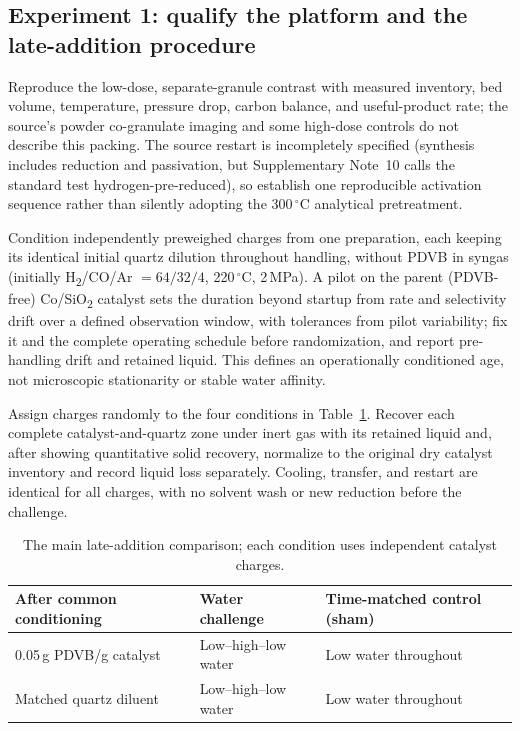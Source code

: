 \subsection{Experiment 1: qualify the platform and the late-addition procedure}

Reproduce the low-dose, separate-granule contrast with measured inventory, bed volume, temperature, pressure drop, carbon balance, and useful-product rate; the source's powder co-granulate imaging and some high-dose controls do not describe this packing. The source restart is incompletely specified (synthesis includes reduction and passivation, but Supplementary Note~10 calls the standard test hydrogen-pre-reduced), so establish one reproducible activation sequence rather than silently adopting the 300\,$^\circ$C analytical pretreatment.\cite{fang2026}

Condition independently preweighed charges from one preparation, each keeping its identical initial quartz dilution throughout handling, without PDVB in syngas (initially H\textsubscript{2}/CO/Ar $=64/32/4$, 220\,$^\circ$C, 2\,MPa). A pilot on the parent (PDVB-free) Co/SiO\textsubscript{2} catalyst sets the duration beyond startup from rate and selectivity drift over a defined observation window, with tolerances from pilot variability; fix it and the complete operating schedule before randomization, and report pre-handling drift and retained liquid. This defines an operationally conditioned age, not microscopic stationarity or stable water affinity.

Assign charges randomly to the four conditions in Table~\ref{tab:water-design}. Recover each complete catalyst-and-quartz zone under inert gas with its retained liquid and, after showing quantitative solid recovery, normalize to the original dry catalyst inventory and record liquid loss separately. Cooling, transfer, and restart are identical for all charges, with no solvent wash or new reduction before the challenge.

\begin{table}[ht]
\centering
\caption{The main late-addition comparison; each condition uses independent catalyst charges.}
\label{tab:water-design}
\begin{tabularx}{\linewidth}{@{}lXX@{}}
\toprule
After common conditioning & Water challenge & Time-matched control (sham)\\
\midrule
0.05\,g PDVB/g catalyst & Low--high--low water & Low water throughout\\
Matched quartz diluent & Low--high--low water & Low water throughout\\
\bottomrule
\end{tabularx}
\end{table}

